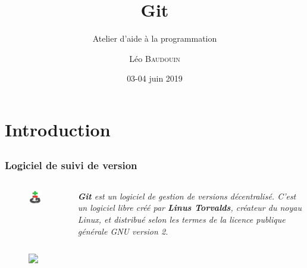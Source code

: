 \documentclass{beamer}
\title{Git}
\subtitle{Atelier d'aide à la programmation}
\author{L\'eo \textsc{Baudouin}}
\institute{
  {\url{baudouin.leo @ gmail.com}}
}
\date{03-04 juin 2019}
\begin{document}
\begin{frame}
  \titlepage
\end{frame}

\section{Introduction}

\subsection{}
\begin{frame}[label=git]
  \frametitle{Logiciel de suivi de version}
  \begin{columns}
    \begin{column}{0.2\linewidth}
      \begin{figure}
	\includegraphics[width=0.95\linewidth]{images/git-logo}  
      \end{figure}
    \end{column}
    \begin{column}{0.8\linewidth}  
      \textit{\textbf{Git} est un logiciel de gestion de versions décentralisé. C'est un logiciel libre créé par \textbf{Linus Torvalds}, créateur du noyau Linux, et distribué selon les termes de la licence publique générale GNU version 2.}
    \end{column}
  \end{columns}
  
  \begin{figure}
    \includegraphics<2>[width=0.95\linewidth]{images/github}  
  \end{figure}
  
\end{frame}
\end{document}
